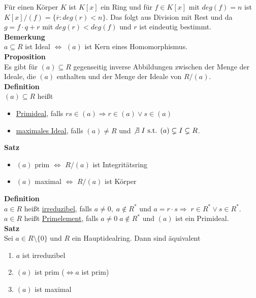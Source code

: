 \documentclass[a4paper, 12pt]{article}
\begin{document}
Für einen Körper $K$ ist $K[x]$ ein Ring und für $f \in K[x]$ mit $deg(f) = n$ ist $K[x]/(f) = \{\overline{r}: deg(r) < n\}$. Das folgt aus Division mit Rest und da $g = f\cdot q + r$ mit $deg(r) < deg(f)$ und $r$ ist eindeutig bestimmt.\\

\noindent\textbf{Bemerkung}\\
$a \subseteq R$ ist Ideal $\Leftrightarrow$ $(a)$ ist Kern eines Homomorphismus.\\
\textbf{Proposition}\\
Es gibt für $(a) \subseteq R$ gegenseitig inverse Abbildungen zwischen der Menge der Ideale, die $(a)$ enthalten und der Menge der Ideale von $R/(a)$.\\
\textbf{Definition}\\
$(a) \subseteq R$ heißt \begin{itemize}
	\item \underline{Primideal}, falls $rs \in (a) \Rightarrow r \in (a) \lor s \in (a)$
	\item \underline{maximales Ideal}, falls $(a) \neq R$ und $\not \exists\; I \text{ s.t. } (a) \subsetneq I \subsetneq R$.
\end{itemize} 
\textbf{Satz}\begin{itemize}
	\item $(a)$ prim $\Leftrightarrow$ $R/(a)$ ist Integritätsring
	\item $(a)$ maximal $\Leftrightarrow$ $R/(a)$ ist Körper
\end{itemize}
\textbf{Definition}\\
$a \in R$ heißt \underline{irreduzibel}, falls $a \neq 0, \; a \notin R^*$ und $a = r\cdot s \Rightarrow \; r \in R^* \lor s \in R^*$.\\
$a \in R$ heißt \underline{Primelement}, falls $a \neq 0 \; a \notin R^*$ und $(a)$ ist ein Primideal.\\
\textbf{Satz}\\
Sei $a \in R \setminus \{0\}$ und $R$ ein Hauptidealring. Dann sind äquivalent \begin{enumerate}
	\item $a$ ist irreduzibel
	\item $(a)$ ist prim ($\Leftrightarrow a$ ist prim)
	\item $(a)$ ist maximal
\end{enumerate}
\end{document}
